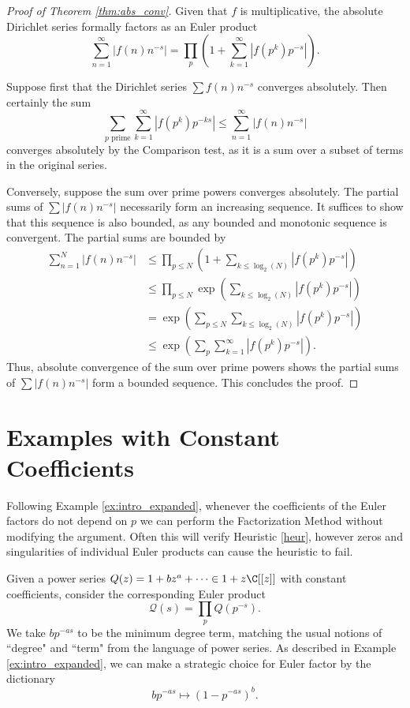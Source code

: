 \documentclass[12pt]{amsart}
\theoremstyle{plain}
\begin{document}
\begin{proof}[Proof of Theorem \ref{thm:abs_conv}]
    Given that $f$ is multiplicative, the absolute Dirichlet series formally factors as an Euler product
    \[
    \sum_{n=1}^{\infty} |f(n)n^{-s}| = \prod_p\left(1 + \sum_{k=1}^{\infty}|f(p^k)p^{-s}|\right).
    \]

    Suppose first that the Dirichlet series $\sum f(n) n^{-s}$ converges absolutely. Then certainly the sum
    \[
    \sum_{p\text{ prime}}\sum_{k=1}^{\infty} |f(p^k) p^{-ks}| \le \sum_{n=1}^{\infty} |f(n)n^{-s}|
    \]
    converges absolutely by the Comparison test, as it is a sum over a subset of terms in the original series.

    Conversely, suppose the sum over prime powers converges absolutely. The partial sums of $\sum |f(n) n^{-s}|$ necessarily form an increasing sequence. It suffices to show that this sequence is also bounded, as any bounded and monotonic sequence is convergent. The partial sums are bounded by
    \begin{align*}
    \sum_{n=1}^N |f(n)n^{-s}| &\le \prod_{p\le N}\left(1 + \sum_{k\le \log_2(N)}|f(p^k)p^{-s}|\right)\\
    &\le \prod_{p\le N} \exp\left(\sum_{k\le \log_2(N)}|f(p^k)p^{-s}|\right)\\
    &=\exp\left(\sum_{p\le N}\sum_{k\le \log_2(N)}|f(p^k)p^{-s}|\right)\\
    &\le \exp\left(\sum_{p}\sum_{k=1}^{\infty}|f(p^k)p^{-s}|\right).
    \end{align*}
    Thus, absolute convergence of the sum over prime powers shows the partial sums of $\sum |f(n) n^{-s}|$ form a bounded sequence. This concludes the proof.
\end{proof}





\section{Examples with Constant Coefficients}\label{sec:examples_with_const_coef}
Following Example \ref{ex:intro_expanded}, whenever the coefficients of the Euler factors do not depend on $p$ we can perform the Factorization Method without modifying the argument. Often this will verify Heuristic \ref{heur}, however zeros and singularities of individual Euler products can cause the heuristic to fail.

Given a power series $Q(z) = 1 + bz^a + \cdots\in 1 + z\C[[z]]$ with constant coefficients, consider the corresponding Euler product
\[
\mathcal{Q}(s) = \prod_p Q(p^{-s}).
\]
We take $b p^{-as}$ to be the minimum degree term, matching the usual notions of ``degree" and ``term" from the language of power series. As described in Example \ref{ex:intro_expanded}, we can make a strategic choice for Euler factor by the dictionary
\[
b p^{-as} \longmapsto (1- p^{-as})^{b}.
\]
\end{document}
